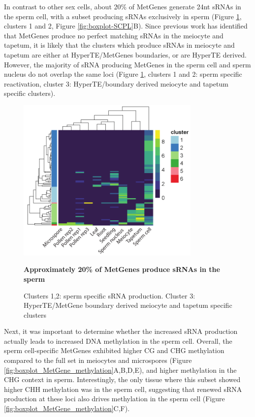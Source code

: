 In contrast to other sex cells, about 20\% of MetGenes generate 24nt sRNAs in the sperm cell, with a subset producing sRNAs exclusively in sperm (Figure \ref{fig:hm_metgene_reactivated}, clusters 1 and 2, Figure \ref{fig:boxplot-SCPL}B). Since previous work has identified that MetGenes produce no perfect matching sRNAs in the meiocyte and tapetum\cite{RN187}, it is likely that the clusters which produce sRNAs in meiocyte and tapetum are either at HyperTE/MetGenes boundaries, or are HyperTE derived. However, the majority of sRNA producing MetGenes in the sperm cell and sperm nucleus do not overlap the same loci (Figure \ref{fig:hm_metgene_reactivated}, clusters 1 and 2: sperm specific reactivation, cluster 3: HyperTE/boundary derived meiocyte and tapetum specific clusters).

\begin{figure}[htbp!] 
\centering
    \includegraphics[width=0.8\textwidth]{Chapter2/Figs/Figure11_Reactivated_MetGenes_heatmap.pdf}
\caption{\textbf{Approximately 20\% of MetGenes produce sRNAs in the sperm}}
\label{fig:hm_metgene_reactivated}
\captionsetup{font=small}
    \caption*{Clusters 1,2: sperm specific sRNA production. Cluster 3: HyperTE/MetGene boundary derived meiocyte and tapetum specific clusters}
\end{figure}

Next, it was important to determine whether the increased sRNA production actually leads to increased DNA methylation in the sperm cell. Overall, the sperm cell-specific MetGenes exhibited higher CG and CHG methylation compared to the full set in meiocytes and microspores (Figure \ref{fig:boxplot_MetGene_methylation}A,B,D,E), and higher methylation in the CHG context in sperm. Interestingly, the only tissue where this subset showed higher CHH methylation was in the sperm cell, suggesting that renewed sRNA production at these loci also drives methylation in the sperm cell (Figure \ref{fig:boxplot_MetGene_methylation}C,F).

